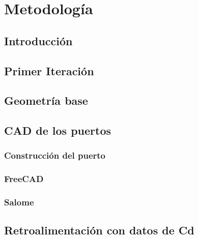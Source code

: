 



\chapter{Metodología}
\label{capitulo3}

\section{Introducción}
\section{Primer Iteración}
\section{Geometría base}
\section{CAD de los puertos}
\subsection{Construcción del puerto}
\subsection{FreeCAD}
\subsection{Salome}
\section{Retroalimentación con datos de Cd}
